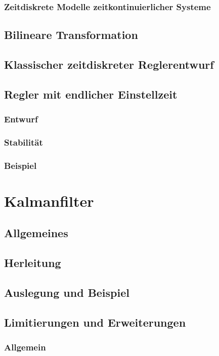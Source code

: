 \documentclass[12pt]{article}
\begin{document}
\subsubsection{Zeitdiskrete Modelle zeitkontinuierlicher Systeme}
\subsection{Bilineare Transformation}
\subsection{Klassischer zeitdiskreter Reglerentwurf}
\subsection{Regler mit endlicher Einstellzeit}
\subsubsection{Entwurf}
\subsubsection{Stabilität}
\subsubsection{Beispiel}

\clearpage
\section{Kalmanfilter}
\subsection{Allgemeines}
\subsection{Herleitung}
\subsection{Auslegung und Beispiel}
\subsection{Limitierungen und Erweiterungen}

\subsubsection{Allgemein}
\end{document}
